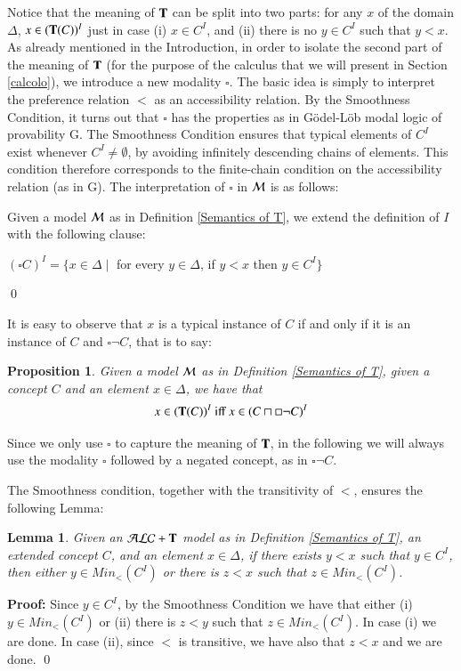 \documentclass[a4paper, 11pt, oneside]{elsarticle}
\newcommand{\tip}{{\bf T}}
\newcommand{\alct}{\mathcal{ALC}+\tip}
\newcommand {\vuoto} {\emptyset}
\newcommand {\nott} {\lnot}
\newcommand {\tc} {\mid}
\newcommand {\appartiene} {\in}
\newcommand {\emme} {\begin{mathcal}M\end{mathcal}}
\newcommand {\bbox}{\square}
\newcommand {\diverso} {\neq}
\newenvironment{proof}
{\begin{trivlist} \item[] {\bf Proof:}}%
{\qed \end{trivlist}}
\newenvironment{definition}
{\begin{defi} \rm}{\qed \end{defi}}
\newtheorem{proposition}{Proposition}
\newtheorem{lemma}{Lemma}
\newcounter{posu}
\newtheorem{lemma}[posu]{Lemma}
\newtheorem{proposition}[posu]{Proposition}
\newtheorem{definition}[posu]{Definition}
\newtheorem{proof}[posu]{Proof}
\begin{document}
\noindent Notice that the meaning of $\tip$ can be split into two parts: for any
$x$ of the domain $\Delta$,  $x \in (\tip(C))^I$ just in case
(i) $x \in C^I$, and (ii) there is no $y \in C^I$ such that $y < x$. As already mentioned in the Introduction,
in order to isolate the second part of the meaning of $\tip$ (for the
purpose of the calculus that we will present in Section \ref{calcolo}), we introduce
a new modality $\bbox$. The basic idea is simply to interpret the preference
relation $<$ as an accessibility relation. By the Smoothness
Condition, it turns out that $\bbox$ has the
properties as in G\"odel-L\"ob modal logic of provability G. The
Smoothness Condition ensures that typical elements of $C^I$ exist
whenever $C^I \diverso \vuoto$, by avoiding infinitely
descending chains of elements. This condition therefore
corresponds to the finite-chain condition on the accessibility
relation (as in G).
The interpretation of $\bbox$ in $\emme$ is as follows:

\begin{definition}\label{def-box}
Given a model $\emme$ as in Definition \ref{Semantics of T}, we extend the definition of $I$ with the following clause:
\begin{center}
      $ (\bbox C)^I = \{x \in \Delta \tc $  for every $y \appartiene \Delta$, if
    $y < x$ then $y \in C^I \}$
\end{center}
\end{definition}


\noindent It is easy to observe that $x$ is a typical instance  of $C$ if and only if it is an instance of $C$ and $\bbox \nott C$, that is to say:

\begin{proposition}\label{Relation between T an box}
Given a model $\emme$ as in Definition \ref{Semantics of T}, given a concept $C$ and an element $x \in \Delta$, we have that
$$x \in (\tip(C))^I \ \mbox{iff} \  x \in (C \sqcap \bbox \neg C)^I$$
\end{proposition}

\noindent
Since we only use $\bbox$ to capture the meaning of $\tip$, in the
following we will always use the modality $\bbox$ followed by a negated concept,
as in $\bbox \neg C$.

The Smoothness condition, together with the transitivity of $<$, ensures the following Lemma:

\begin{lemma}\label{ssc}
Given an $\alct$ model as in Definition \ref{Semantics of T}, an extended concept $C$, and an element $x \in \Delta$, if there exists $y < x$ such that $y \in C^I$, then either $y \in Min_<(C^I)$ or there is $z<x$ such that $z \in Min_<(C^I)$.
\end{lemma}
\begin{proof}
Since $y \in C^I$, by the Smoothness Condition we have that either (i) $y \in Min_<(C^I)$ or (ii) there is $z<y$ such that $z \in Min_<(C^I)$. In case (i) we are done. In case (ii), since $<$ is transitive, we have also that $z< x$ and we are done.
\end{proof}
\end{document}
